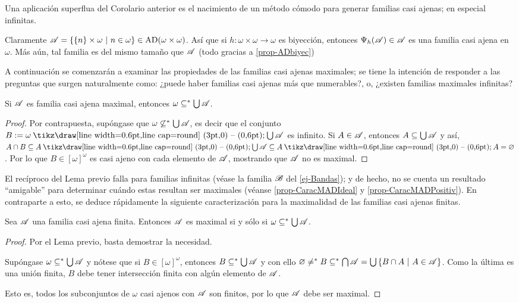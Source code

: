  Una aplicación superflua del Corolario anterior es el nacimiento de un método cómodo para generar familias casi ajenas; en especial infinitas.

 \begin{ejemplo}
  \label{ej-Bandas}
  Claramente $\mathscr{A}=\{ \{n\} \times \omega \text{ $|$ } n \in \omega \} \in \operatorname{AD}(\omega \times \omega)$. Así que si $h:\omega \times \omega \to \omega$ es biyección, entonces $\Psi_h(\mathscr{A}) \in \mathscr{A}$ es una familia casi ajena en $\omega$. Más aún, tal familia es del mismo tamaño que $\mathscr{A}$ (todo gracias a \ref{prop-ADbiyec})
 \end{ejemplo}

 A continuación se comenzarán a examinar las propiedades de las familias casi ajenas maximales; se tiene la intención de responder a las preguntas que surgen naturalmente como: ¿puede haber familias casi ajenas más que numerables?, o, ¿existen familias maximales infinitas?

 \begin{lema}\label{lem-MADnecesarioUnion}
  Si $\mathscr{A}$ es familia casi ajena maximal, entonces $\omega \subseteq^* \mbox{$\bigcup$}\, \mathscr{A}$.
 \end{lema}

 \begin{proof}
  Por contrapuesta, supóngase que $\omega \not\subseteq^* \mbox{$\bigcup$}\, \mathscr{A}$, es decir que el conjunto $B:=\omega \setminus \midcup \ms{A}$ es infinito. Si $A \in \mathscr{A}$, entonces $A \subseteq \mbox{$\bigcup$}\, \mathscr{A}$ y así, $A \cap B \subseteq A \setminus \midcup \ms{A} \subseteq A \setminus A = \emptyset$. Por lo que $B \in [\omega]^\omega$ es casi ajeno con cada elemento de $\mathscr{A}$, mostrando que $\mathscr{A}$ no es maximal.
 \end{proof}

 El recíproco del Lema previo falla para familias infinitas (véase la familia $\mathscr{B}$ del \autoref{ej-Bandas}); y de hecho, no se cuenta un resultado ``amigable'' para determinar cuándo estas resultan ser maximales (véanse \ref{prop-CaracMADIdeal} y \ref{prop-CaracMADPositiv}). En contraparte a esto, se deduce rápidamente la siguiente caracterización para la maximalidad de las familias casi ajenas finitas.

 \begin{corolario}\label{cor-MADnecesarioUnion}
  Sea $\mathscr{A}$ una familia casi ajena finita. Entonces $\mathscr{A}$ es maximal si y sólo si $\omega \subseteq^* \mbox{$\bigcup$}\, \mathscr{A}$.
 \end{corolario}

 \begin{proof}
  Por el Lema previo, basta demostrar la necesidad.

  Supóngase $\omega \subseteq^* \mbox{$\bigcup$}\, \mathscr{A}$ y nótese que si $B \in [\omega]^\omega$, entonces $B \subseteq^*\mbox{$\bigcup$}\, \mathscr{A}$ y con ello $\varnothing \neq^* B  \subseteq^* \mbox{$\bigcap$}\, \mathscr{A} = \mbox{$\bigcup$}\,\{B \cap A \text{ $|$ } A \in \mathscr{A}\}$. Como la última es una unión finita, $B$ debe tener intersección finita con algún elemento de $\mathscr{A}$.

  Esto es, todos los subconjuntos de $\omega$ casi ajenos con $\mathscr{A}$ son finitos, por lo que $\mathscr{A}$ debe ser maximal.
 \end{proof}

